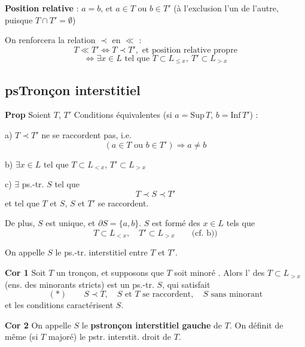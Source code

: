 \documentclass[11pt,a4paper]{article}
\begin{document}
\textbf{Position relative }  : $a = b$, et $a \in T$ ou $b \in T'$ (à l'exclusion l'un de l'autre, puisque $T \cap T' = \emptyset$)

 On renforcera la relation $\prec$ en $\ll$ :
\[
  T \ll T' \iff T \prec T', \text{ et position relative propre}
\]
\[
  \iff \exists x \in L \text{ tel que } T \subset L_{\leq x},\ T' \subset L_{>x}
\]

\subsection{psTronçon interstitiel}

\textbf{Prop} Soient $T$, $T'$  Conditions équivalentes (si $a = \mathrm{Sup}\, T$, $b = \mathrm{Inf}\, T'$)  :

a) $T \prec T'$  ne se raccordent pas, i.e.
\[
  (a \in T \text{ ou } b \in T') \Longrightarrow a \neq b
\]

 b) $\exists x \in L$ tel que $T \subset L_{<x}$, $T' \subset L_{>x}$

c) $\exists$ ps.-tr. $S$ tel que
\[
  T \prec S \prec T'
\]
et tel que $T$ et $S$, $S$ et $T'$ se raccordent.

De plus, $S$ est unique, et $\partial S = \{a,b\}$. $S$ est formé des $x \in L$ tels que
\[
  T \subset L_{<x}, \quad T' \subset L_{>x} \qquad \text{(cf. b))}
\]

On appelle $S$ le ps.-tr. interstitiel entre $T$ et $T'$.

\textbf{Cor 1} Soit $T$ un tronçon, et supposons que $T$ soit minoré . Alors l' des  $T \subset L_{>x}$ (ens. des minorants stricts) est un  ps.-tr. $S$, qui satisfait \struck{\ill{}}
\[
  (*) \qquad S \prec T, \quad S \text{ et } T \text{ se raccordent}, \quad S \text{ sans minorant}
\]
et les conditions  caractérisent $S$.

\textbf{Cor 2}  On appelle $S$ le \textbf{pstronçon interstitiel gauche} de $T$. On définit de même (si $T$ majoré) le pstr. interstit. droit de $T$.

\end{document}
